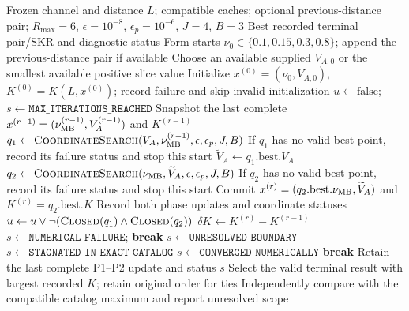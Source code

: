 \begin{algorithm}[t]
\caption{Exact-source alternating optimization with explicit search status}
\label{alg:ao}
\small
\begin{algorithmic}[1]
\Require Frozen channel and distance $L$; compatible caches; optional previous-distance pair;
$R_{\max}=6$, $\epsilon=10^{-8}$, $\epsilon_p=10^{-6}$, $J=4$, $B=3$
\Ensure Best recorded terminal pair/SKR and diagnostic status
\State Form starts $\nu_0\in\{0.1,0.15,0.3,0.8\}$; append the previous-distance pair if available
 \State Choose an available supplied $V_{A,0}$ or the smallest available positive slice value
 \State Initialize $x^{(0)}=(\nu_0,V_{A,0})$, $K^{(0)}=K(L,x^{(0)})$; record failure and skip invalid initialization
 \State $u\gets\mathrm{false}$; $s\gets\texttt{MAX\_ITERATIONS\_REACHED}$
  \State Snapshot the last complete $x^{(r-1)}=(\nu_{\rm MB}^{(r-1)},V_A^{(r-1)})$ and $K^{(r-1)}$
  \State $q_1\gets\Call{CoordinateSearch}{V_A,\nu_{\rm MB}^{(r-1)},\epsilon,\epsilon_p,J,B}$
  \State If $q_1$ has no valid best point, record its failure status and stop this start
  \State $\widetilde V_A\gets q_1.\mathrm{best}.V_A$ 
  \State $q_2\gets\Call{CoordinateSearch}{\nu_{\rm MB},\widetilde V_A,\epsilon,\epsilon_p,J,B}$
  \State If $q_2$ has no valid best point, record its failure status and stop this start
  \State Commit $x^{(r)}=(q_2.\mathrm{best}.\nu_{\rm MB},\widetilde V_A)$ and $K^{(r)}=q_2.\mathrm{best}.K$
  \State Record both phase updates and coordinate statuses
  \State $u\gets u\lor\neg(\Call{Closed}{q_1}\land\Call{Closed}{q_2})$
  \State $\delta K\gets K^{(r)}-K^{(r-1)}$
   \State $s\gets\texttt{NUMERICAL\_FAILURE}$; \textbf{break}
   
    \State $s\gets\texttt{UNRESOLVED\_BOUNDARY}$
    \State $s\gets\texttt{STAGNATED\_IN\_EXACT\_CATALOG}$
   \Else
    \State $s\gets\texttt{CONVERGED\_NUMERICALLY}$
   \EndIf
   \State \textbf{break}
  \EndIf
 \EndFor
 \State Retain the last complete P1--P2 update and status $s$
\EndFor
\State Select the valid terminal result with largest recorded $K$; retain original order for ties
\State Independently compare with the compatible catalog maximum and report unresolved scope
\end{algorithmic}
\end{algorithm}
